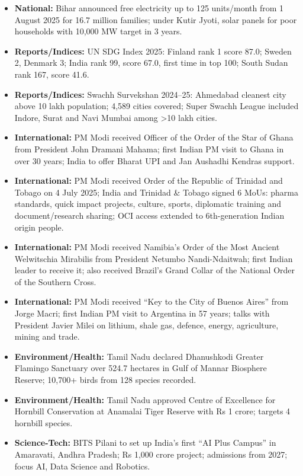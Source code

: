 \documentclass[10pt,a4paper]{article}
\begin{document}
\begin{itemize}
    \item \textbf{National:} Bihar announced free electricity up to 125 units/month from 1 August 2025 for 16.7 million families; under Kutir Jyoti, solar panels for poor households with 10,000 MW target in 3 years.
    \item \textbf{Reports/Indices:} UN SDG Index 2025: Finland rank 1 score 87.0; Sweden 2, Denmark 3; India rank 99, score 67.0, first time in top 100; South Sudan rank 167, score 41.6.
    \item \textbf{Reports/Indices:} Swachh Survekshan 2024--25: Ahmedabad cleanest city above 10 lakh population; 4,589 cities covered; Super Swachh League included Indore, Surat and Navi Mumbai among >10 lakh cities.
    \item \textbf{International:} PM Modi received Officer of the Order of the Star of Ghana from President John Dramani Mahama; first Indian PM visit to Ghana in over 30 years; India to offer Bharat UPI and Jan Aushadhi Kendras support.
    \item \textbf{International:} PM Modi received Order of the Republic of Trinidad and Tobago on 4 July 2025; India and Trinidad \& Tobago signed 6 MoUs: pharma standards, quick impact projects, culture, sports, diplomatic training and document/research sharing; OCI access extended to 6th-generation Indian origin people.
    \item \textbf{International:} PM Modi received Namibia's Order of the Most Ancient Welwitschia Mirabilis from President Netumbo Nandi-Ndaitwah; first Indian leader to receive it; also received Brazil's Grand Collar of the National Order of the Southern Cross.
    \item \textbf{International:} PM Modi received ``Key to the City of Buenos Aires'' from Jorge Macri; first Indian PM visit to Argentina in 57 years; talks with President Javier Milei on lithium, shale gas, defence, energy, agriculture, mining and trade.
    \item \textbf{Environment/Health:} Tamil Nadu declared Dhanushkodi Greater Flamingo Sanctuary over 524.7 hectares in Gulf of Mannar Biosphere Reserve; 10,700+ birds from 128 species recorded.
    \item \textbf{Environment/Health:} Tamil Nadu approved Centre of Excellence for Hornbill Conservation at Anamalai Tiger Reserve with Rs 1 crore; targets 4 hornbill species.
    \item \textbf{Science-Tech:} BITS Pilani to set up India's first ``AI Plus Campus'' in Amaravati, Andhra Pradesh; Rs 1,000 crore project; admissions from 2027; focus AI, Data Science and Robotics.

\end{itemize}
\end{document}
